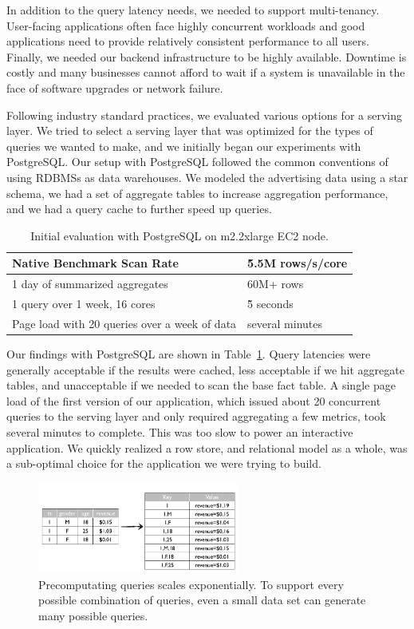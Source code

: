 \documentclass{vldb}
\begin{document}
In addition to the query latency needs, we needed to support multi-tenancy.
User-facing applications often face highly concurrent workloads and good
applications need to provide relatively consistent performance to all users.
Finally, we needed our backend infrastructure to be highly available. Downtime
is costly and many businesses cannot afford to wait if a system is unavailable
in the face of software upgrades or network failure.

Following industry standard practices, we evaluated various options for a
serving layer. We tried to select a serving layer that was optimized for the
types of queries we wanted to make, and we initially began our experiments with
PostgreSQL\cite{stonebraker1987extendability}. Our setup with PostgreSQL
followed the common conventions of using RDBMSs as data warehouses. We modeled
the advertising data using a star schema, we had a set of aggregate tables to
increase aggregation performance, and we had a query cache to further speed up
queries.

\begin{table}
\centering
\scriptsize\begin{tabular}{| l | l |}
  \hline
  Native Benchmark Scan Rate & \~5.5M rows/s/core \\ \hline
  1 day of summarized aggregates & 60M+ rows \\ \hline
  1 query over 1 week, 16 cores & \~5 seconds \\ \hline
  Page load with 20 queries over a week of data & several minutes \\ \hline
\end{tabular}
\normalsize
\caption{Initial evaluation with PostgreSQL on m2.2xlarge EC2 node.}
\label{tab:postgres_results}
\end{table}

Our findings with PostgreSQL are shown in Table~\ref{tab:postgres_results}.
Query latencies were generally acceptable if the results were cached, less
acceptable if we hit aggregate tables, and unacceptable if we needed to scan
the base fact table. A single page load of the first version of our
application, which issued about 20 concurrent queries to the serving layer and
only required aggregating a few metrics, took several minutes to complete. This
was too slow to power an interactive application. We quickly realized a row
store, and relational model as a whole, was a sub-optimal choice for the
application we were trying to build.

\begin{figure}
\centering
\includegraphics[width = 2.6in]{precompute}
\caption{Precomputating queries scales exponentially. To support every possible
combination of queries, even a small data set can generate many possible
queries.
}
\label{fig:precompute}
\end{figure}
\end{document}
